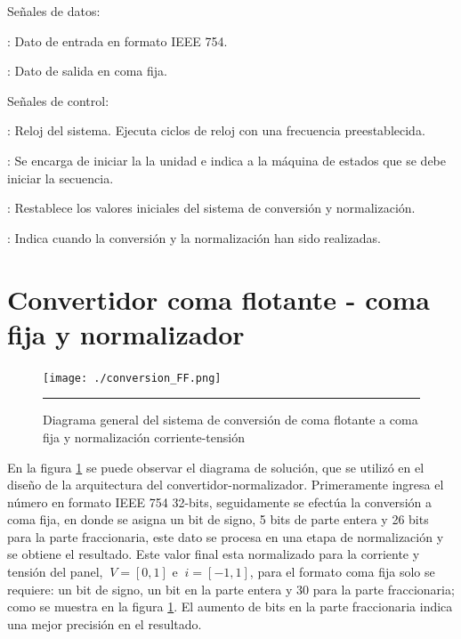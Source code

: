 Señales de datos: 

\begin{compactitem}

\item {}: Dato de entrada en formato IEEE 754.
\item {}: Dato de salida en coma fija.

\end{compactitem}

Señales de control: 

\begin{compactitem}

\item {}: Reloj del sistema. Ejecuta ciclos de reloj con una frecuencia preestablecida. 

\item {}: Se encarga de iniciar la la unidad e indica a la máquina de estados que se debe iniciar la secuencia. 

\item {}: Restablece los valores iniciales del sistema de conversión y normalización.

\item {}: Indica cuando la conversión y la normalización han sido realizadas.

\end{compactitem}


 

\section{Convertidor coma flotante - coma fija y normalizador }


\begin{figure}[H]
  \centering
    \texttt{[image: ./conversion\_FF.png]}
    \rule{35em}{0.5pt}
  \caption[Diagrama general del sistema de conversión de coma flotante a coma fija y normalización corriente-tensión]{Diagrama general del sistema de conversión de coma flotante a coma fija y normalización corriente-tensión}
  \label{fig:FF}
\end{figure}



En la figura \ref{fig:FF} se puede observar el diagrama de solución, que se utilizó en el diseño de la arquitectura del convertidor-normalizador. 
Primeramente ingresa el número en formato IEEE 754 32-bits, seguidamente se efectúa la conversión a coma fija, en donde se asigna un bit de signo, 5 bits de parte entera y 26 bits para la parte fraccionaria, este dato se procesa en una etapa de normalización y se obtiene el resultado. Este valor final esta normalizado para la corriente y tensión del panel, $\ V = [0,1]$ e $\ i = [-1,1]$, para el formato coma fija solo se requiere: un bit de signo, un bit en la parte entera y 30 para la parte fraccionaria; como se muestra en la figura \ref{fig:FF}. El aumento de bits en la parte fraccionaria indica una mejor precisión en el resultado. 


